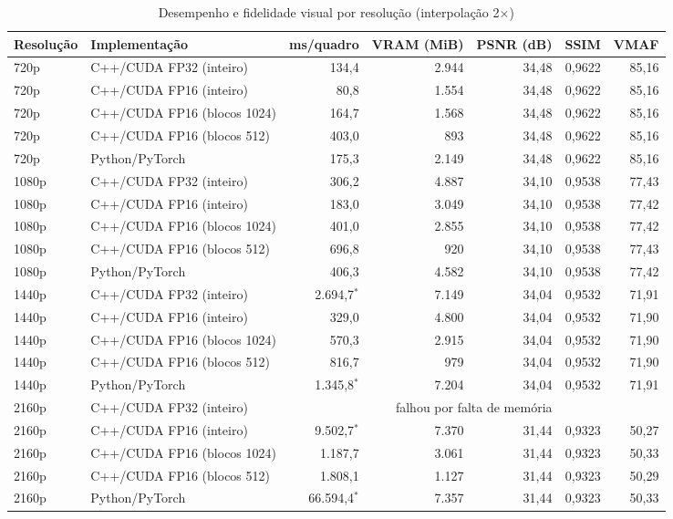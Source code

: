 \begin{table}[htb]
\centering
\caption{Desempenho e fidelidade visual por resolução (interpolação 2$\times$)}
\label{tab:resultados_gta}
\small
\begin{tabular}{llrrrrr}
\toprule
\textbf{Resolução} & \textbf{Implementação} & \textbf{ms/quadro} & \textbf{VRAM (MiB)} & \textbf{PSNR (dB)} & \textbf{SSIM} & \textbf{VMAF} \\
\midrule
720p & C++/CUDA FP32 (inteiro) & 134,4 & 2.944 & 34,48 & 0,9622 & 85,16 \\
720p & C++/CUDA FP16 (inteiro) & 80,8 & 1.554 & 34,48 & 0,9622 & 85,16 \\
720p & C++/CUDA FP16 (blocos 1024) & 164,7 & 1.568 & 34,48 & 0,9622 & 85,16 \\
720p & C++/CUDA FP16 (blocos 512) & 403,0 & 893 & 34,48 & 0,9622 & 85,16 \\
720p & Python/PyTorch & 175,3 & 2.149 & 34,48 & 0,9622 & 85,16 \\
\midrule
1080p & C++/CUDA FP32 (inteiro) & 306,2 & 4.887 & 34,10 & 0,9538 & 77,43 \\
1080p & C++/CUDA FP16 (inteiro) & 183,0 & 3.049 & 34,10 & 0,9538 & 77,42 \\
1080p & C++/CUDA FP16 (blocos 1024) & 401,0 & 2.855 & 34,10 & 0,9538 & 77,42 \\
1080p & C++/CUDA FP16 (blocos 512) & 696,8 & 920 & 34,10 & 0,9538 & 77,43 \\
1080p & Python/PyTorch & 406,3 & 4.582 & 34,10 & 0,9538 & 77,42 \\
\midrule
1440p & C++/CUDA FP32 (inteiro) & 2.694,7$^{*}$ & 7.149 & 34,04 & 0,9532 & 71,91 \\
1440p & C++/CUDA FP16 (inteiro) & 329,0 & 4.800 & 34,04 & 0,9532 & 71,90 \\
1440p & C++/CUDA FP16 (blocos 1024) & 570,3 & 2.915 & 34,04 & 0,9532 & 71,90 \\
1440p & C++/CUDA FP16 (blocos 512) & 816,7 & 979 & 34,04 & 0,9532 & 71,90 \\
1440p & Python/PyTorch & 1.345,8$^{*}$ & 7.204 & 34,04 & 0,9532 & 71,91 \\
\midrule
2160p & C++/CUDA FP32 (inteiro) & \multicolumn{5}{c}{falhou por falta de memória} \\
2160p & C++/CUDA FP16 (inteiro) & 9.502,7$^{*}$ & 7.370 & 31,44 & 0,9323 & 50,27 \\
2160p & C++/CUDA FP16 (blocos 1024) & 1.187,7 & 3.061 & 31,44 & 0,9323 & 50,33 \\
2160p & C++/CUDA FP16 (blocos 512) & 1.808,1 & 1.127 & 31,44 & 0,9323 & 50,29 \\
2160p & Python/PyTorch & 66.594,4$^{*}$ & 7.357 & 31,44 & 0,9323 & 50,33 \\
\bottomrule
\end{tabular}
\end{table}
